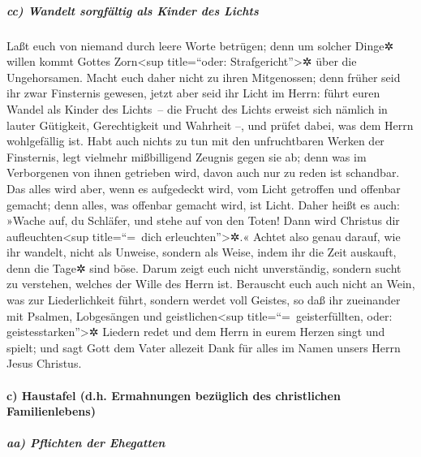 \hypertarget{cc-wandelt-sorgfuxe4ltig-als-kinder-des-lichts}{%
\subparagraph{cc) Wandelt sorgfältig als Kinder des
Lichts}\label{cc-wandelt-sorgfuxe4ltig-als-kinder-des-lichts}}

 Laßt euch von niemand durch leere Worte betrügen; denn um
solcher Dinge✲ willen kommt Gottes Zorn\textless sup title=``oder:
Strafgericht''\textgreater✲ über die Ungehorsamen.  Macht
euch daher nicht zu ihren Mitgenossen;  denn früher seid
ihr zwar Finsternis gewesen, jetzt aber seid ihr Licht im Herrn: führt
euren Wandel als Kinder des Lichts~--  die Frucht des
Lichts erweist sich nämlich in lauter Gütigkeit, Gerechtigkeit und
Wahrheit --,  und prüfet dabei, was dem Herrn
wohlgefällig ist.  Habt auch nichts zu tun mit den
unfruchtbaren Werken der Finsternis, legt vielmehr mißbilligend Zeugnis
gegen sie ab;  denn was im Verborgenen von ihnen
getrieben wird, davon auch nur zu reden ist schandbar. 
Das alles wird aber, wenn es aufgedeckt wird, vom Licht getroffen und
offenbar gemacht; denn alles, was offenbar gemacht wird, ist Licht.
 Daher heißt es auch: »Wache auf, du Schläfer, und stehe
auf von den Toten! Dann wird Christus dir aufleuchten\textless sup
title=``=~dich erleuchten''\textgreater✲.«  Achtet also
genau darauf, wie ihr wandelt, nicht als Unweise, sondern als Weise,
 indem ihr die Zeit auskauft, denn die Tage✲ sind böse.
 Darum zeigt euch nicht unverständig, sondern sucht zu
verstehen, welches der Wille des Herrn ist.  Berauscht
euch auch nicht an Wein, was zur Liederlichkeit führt, sondern werdet
voll Geistes,  so daß ihr zueinander mit Psalmen,
Lobgesängen und geistlichen\textless sup title=``=~geisterfüllten, oder:
geistesstarken''\textgreater✲ Liedern redet und dem Herrn in eurem
Herzen singt und spielt;  und sagt Gott dem Vater
allezeit Dank für alles im Namen unsers Herrn Jesus Christus.

\hypertarget{c-haustafel-d.h.-ermahnungen-bezuxfcglich-des-christlichen-familienlebens}{%
\paragraph{c) Haustafel (d.h. Ermahnungen bezüglich des christlichen
Familienlebens)}\label{c-haustafel-d.h.-ermahnungen-bezuxfcglich-des-christlichen-familienlebens}}

\hypertarget{aa-pflichten-der-ehegatten}{%
\subparagraph{aa) Pflichten der
Ehegatten}\label{aa-pflichten-der-ehegatten}}

